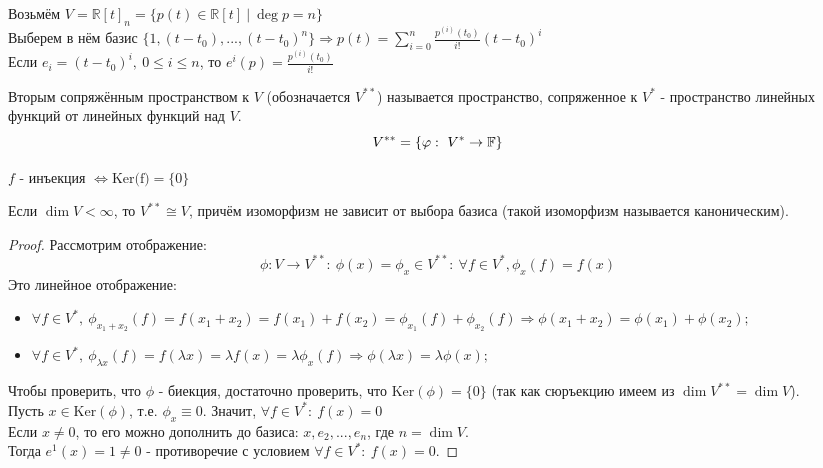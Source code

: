     \begin{example1}
        Возьмём $V = \mathbb{R}[t]_n = \{p(t) \in \mathbb{R}[t] \ | \ \deg p = n\}$\\
        Выберем в нём базис $\{1, (t-t_0), ... , (t-t_0)^n\} \Longrightarrow  p(t) = \sum \limits_{i=0}^n \frac{p^{(i)}(t_0)}{i!}(t-t_0)^i$\\
        Если $e_i = (t-t_0)^i, \ 0\leqslant i\leqslant n$, то $e^i(p) = \frac{p^{(i)}(t_0)}{i!}$
    \end{example1}
    \begin{definition}
        Вторым сопряжённым пространством к $V$ (обозначается $V^{**}$) называется пространство, сопряженное к $V^{*}$ - пространство линейных функций от линейных функций над $V$.
        $$V^{**} = \{\varphi: \ V^{*} \to \mathbb{F}\}$$ 
    \end{definition}
    \begin{lemma}
        $f$ - инъекция $\Longleftrightarrow \text{Ker(f)} =\{0\}$ 
    \end{lemma}
    \begin{theorem}
        Если $\dim V < \infty$, то $V^{**} \cong V$, причём изоморфизм не зависит от выбора базиса (такой изоморфизм называется каноническим). 
    \end{theorem}
    \begin{proof}
        Рассмотрим отображение: 
        $$\phi: V \rightarrow V^{**}: \ \phi(x) = \phi_x \in V^{**} : \ \forall f\in V^{*}, \phi_x(f) = f(x)$$
        Это линейное отображение:
        \begin{itemize}
            \item $\forall f\in V^{*}, \ \phi_{x_1+x_2}(f) = f(x_1 + x_2) = f(x_1) + f(x_2) = \phi_{x_1}(f) + \phi_{x_2}(f) \Longrightarrow  \phi(x_1 + x_2) = \phi(x_1) + \phi(x_2);$ 
            \item $\forall f\in V^{*}, \ \phi_{\lambda x}(f) = f(\lambda x) = \lambda f(x) = \lambda\phi_{x}(f) \Longrightarrow \phi(\lambda x) = \lambda\phi(x);$ 
        \end{itemize}
        Чтобы проверить, что $\phi$ - биекция, достаточно проверить, что $\text{Ker} (\phi) = \{0\}$ (так как сюръекцию имеем из $\dim V^{**} = \dim V$).\\
        Пусть $x \in \text{Ker} (\phi)$, т.е. $\phi_x \equiv 0$. Значит,  $\forall f \in V^{*} : \ f(x) = 0$\\
        Если $x \neq 0$, то его можно дополнить до базиса: $x, e_2, ... , e_n$, где $n = \dim V$.\\
        Тогда $e^1(x) = 1 \neq 0$ - противоречие с условием $\forall f \in V^{*} : \ f(x) = 0$.
    \end{proof}
